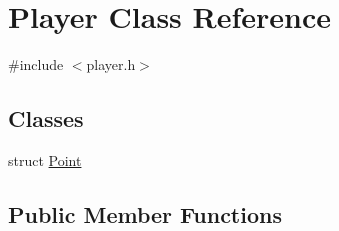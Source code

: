 \hypertarget{classPlayer}{}\section{Player Class Reference}
\label{classPlayer}


{\ttfamily \#include $<$player.\+h$>$}

\subsection*{Classes}
\begin{DoxyCompactItemize}
\item 
struct \hyperlink{structPlayer_1_1Point}{Point}
\end{DoxyCompactItemize}
\subsection*{Public Member Functions}
